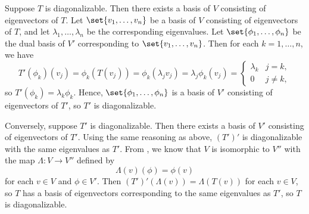 \begin{sol}
    Suppose $T$ is diagonalizable.
    Then there exists a basis of $V$ consisting of eigenvectors of $T$.
    Let $\set{v_1, \ldots, v_n}$ be a basis of $V$ consisting of eigenvectors of $T$, and let $\lambda_1, \ldots, \lambda_n$ be the corresponding eigenvalues.
    Let $\set{\phi_1, \ldots, \phi_n}$ be the dual basis of $V'$ corresponding to $\set{v_1, \ldots, v_n}$.
    Then for each $k = 1, \ldots, n$, we have
    \[
        T'(\phi_k)(v_j) = \phi_k(T(v_j)) = \phi_k(\lambda_j v_j) = \lambda_j \phi_k(v_j) = 
        \begin{cases}
            \lambda_k & j = k, \\
            0 & j \neq k,
        \end{cases}
    \]
    so $T'(\phi_k) = \lambda_k \phi_k$.
    Hence, $\set{\phi_1, \ldots, \phi_n}$ is a basis of $V'$ consisting of eigenvectors of $T'$, so $T'$ is diagonalizable.

    Conversely, suppose $T'$ is diagonalizable.
    Then there exists a basis of $V'$ consisting of eigenvectors of $T'$.
    Using the same reasoning as above, $(T')'$ is diagonalizable with the same eigenvalues as $T'$.
    From , we know that $V$ is isomorphic to $V''$ with the map $\Lambda: V \to V''$ defined by
    \[
        \Lambda(v)(\phi) = \phi(v)
    \]
    for each $v \in V$ and $\phi \in V'$.
    Then $(T')'(\Lambda(v)) = \Lambda(T(v))$ for each $v \in V$, so $T$ has a basis of eigenvectors corresponding to the same eigenvalues as $T'$, so $T$ is diagonalizable.
\end{sol}


